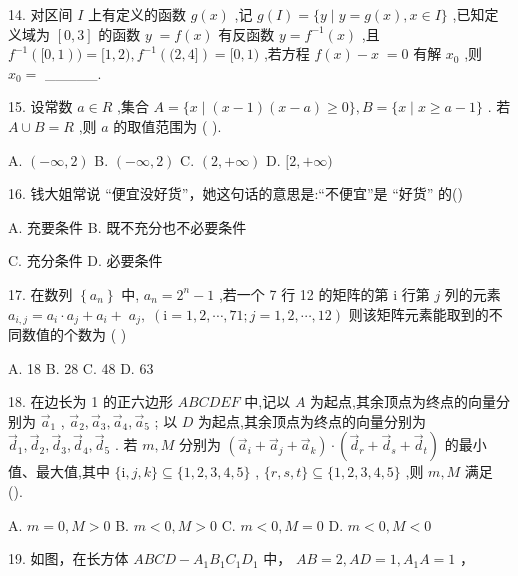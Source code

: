 \documentclass[10pt]{article}
\begin{document}
14. 对区间 \(I\) 上有定义的函数 \(g\left( x\right)\) ,记 \(g\left( I\right)  = \{ y \mid  y = g\left( x\right) ,x \in  I\}\) ,已知定义域为 \(\left\lbrack  {0,3}\right\rbrack\) 的函数 \(y \; = f\left( x\right)\) 有反函数 \(y = {f}^{-1}\left( x\right)\) ,且 \({f}^{-1}\left( {\lbrack 0,1}\right) ) = \lbrack 1,2),{f}^{-1}\left( {(2,4\rbrack }\right)  = \lbrack 0,1)\) ,若方程 \(f\left( x\right)  - x \; = 0\) 有解 \({x}_{0}\) ,则 \({x}_{0} =\) \_\_\_\_\_.

15. 设常数 \(a \in  R\) ,集合 \(A = \{ x \mid  \left( {x - 1}\right) \left( {x - a}\right)  \geq  0\} ,B = \{ x \mid  x \geq  a - 1\}\) . 若 \(A \cup  B = R\) ,则 \(a\) 的取值范围为 ( ).

A. \(\left( {-\infty ,2}\right)\) B. \(\left( {-\infty ,2}\right)\) C. \(\left( {2, + \infty }\right)\) D. \(\lbrack 2, + \infty )\)

16. 钱大姐常说 “便宜没好货”，她这句话的意思是:“不便宜”是 “好货” 的()

A. 充要条件 B. 既不充分也不必要条件

C. 充分条件 D. 必要条件

17. 在数列 \(\left\{  {a}_{n}\right\}\) 中, \({a}_{n} = {2}^{n} - 1\) ,若一个 7 行 12 的矩阵的第 \(\mathrm{i}\) 行第 \(j\) 列的元素 \({a}_{i,j} = {a}_{i} \cdot  {a}_{j} + {a}_{i} + \; {a}_{j},\;\left( {\mathrm{i} = 1,2,\cdots ,{71};j = 1,2,\cdots ,{12}}\right)\) 则该矩阵元素能取到的不同数值的个数为 ( )

A. 18 B. 28 C. 48 D. 63

18. 在边长为 1 的正六边形 \({ABCDEF}\) 中,记以 \(A\) 为起点,其余顶点为终点的向量分别为 \({\overrightarrow{a}}_{1}\) , \({\overrightarrow{a}}_{2},{\overrightarrow{a}}_{3},{\overrightarrow{a}}_{4},{\overrightarrow{a}}_{5}\) ; 以 \(D\) 为起点,其余顶点为终点的向量分别为 \({\overrightarrow{d}}_{1},{\overrightarrow{d}}_{2},{\overrightarrow{d}}_{3},{\overrightarrow{d}}_{4},{\overrightarrow{d}}_{5}\) . 若 \(m,M\) 分别为 \(\left( {{\overrightarrow{a}}_{i} + {\overrightarrow{a}}_{j} + {\overrightarrow{a}}_{k}}\right)  \cdot  \left( {{\overrightarrow{d}}_{r} + {\overrightarrow{d}}_{s} + {\overrightarrow{d}}_{t}}\right)\) 的最小值、最大值,其中 \(\{ \mathrm{i},j,k\}  \subseteq  \{ 1,2,3,4,5\}\) , \(\{ r,s,t\}  \subseteq  \{ 1,2,3,4,5\}\) ,则 \(m,M\) 满足 ().

A. \(m = 0,M > 0\) B. \(m < 0,M > 0\) C. \(m < 0,M = 0\) D. \(m < 0,M < 0\)

19. 如图，在长方体 \({ABCD} - {A}_{1}{B}_{1}{C}_{1}{D}_{1}\) 中， \({AB} = 2,{AD} = 1,{A}_{1}A = 1\) ，
\end{document}

